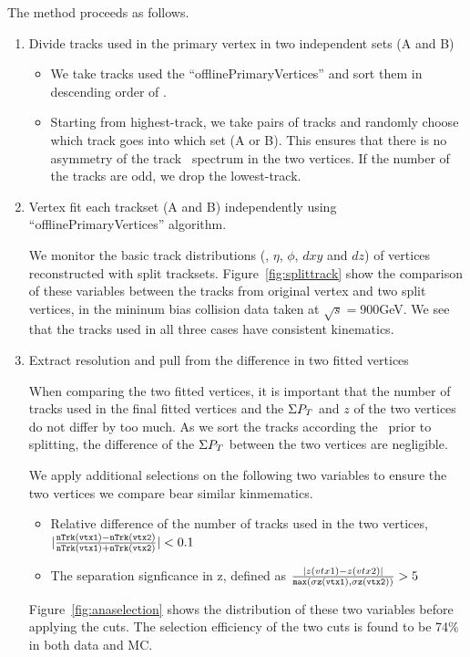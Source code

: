 The method proceeds as follows. 
\begin{enumerate}
\item Divide tracks used in the primary vertex in two independent sets (A and B)
\begin{itemize}
\item
We take tracks used the ``offlinePrimaryVertices'' and sort them in descending order of \pt. 
\item 
Starting from highest-\pt track, we take pairs of tracks and 
randomly choose which track goes into which set (A or B). This 
ensures that there is no asymmetry of the track \pt\, spectrum in 
the two vertices. If the number of the tracks are odd, we drop 
the lowest-\pt track. 
\end{itemize}

\item Vertex fit each trackset (A and B) independently using ``offlinePrimaryVertices'' algorithm.

We monitor the basic track distributions (\pt, $\eta$, $\phi$, $dxy$ and $dz$) 
of vertices reconstructed with split tracksets. Figure~\ref{fig:splittrack} show the 
comparison of these variables between the tracks from original vertex and two split vertices, in 
the mininum bias collision data taken at $\sqrt{s}=$900GeV. 
We see that the tracks used in all three cases have consistent kinematics.

\item Extract resolution and pull from the difference in two fitted vertices

When comparing the two fitted vertices, it is important that 
the number of tracks used in the final fitted vertices and the 
$\Sigma P_T$ and $z$ of the two vertices do not differ by too much. 
As we sort the tracks according the \pt\, prior to splitting, 
the difference of the $\Sigma P_T$ between the two vertices 
are negligible. 

We apply additional selections on the following two variables to ensure 
the two vertices we compare bear similar kinmematics. 
\begin{itemize}
\item Relative difference of the number of tracks used in the two vertices, 
$|\frac{\tt{nTrk(vtx1)-nTrk(vtx2)}}{\tt{nTrk(vtx1)+nTrk(vtx2)}}|<0.1$
\item The separation signficance in z, defined as 
$\frac{|z(vtx1)-z(vtx2)|}{\tt{max}(\sigma z(vtx1),\sigma z(vtx2))}>5$
\end{itemize}
Figure~\ref{fig:anaselection} shows the distribution of these 
two variables before applying the cuts. The selection efficiency of the two 
cuts is found to be 74\% in both data and MC. 


\end{enumerate}
